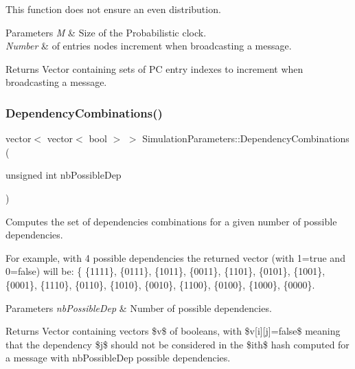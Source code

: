 This function does not ensure an even distribution. 
\begin{DoxyParams}{Parameters}
{\em M} & Size of the Probabilistic clock. \\
\hline
{\em Number} & of entries nodes increment when broadcasting a message. \\
\hline
\end{DoxyParams}
\begin{DoxyReturn}{Returns}
Vector containing sets of PC entry indexes to increment when broadcasting a message. 
\end{DoxyReturn}
\mbox{\label{class_simulation_parameters_a9694dd5f7c2028efe03dc273d8fdcbd7}} 
\subsubsection{\texorpdfstring{Dependency\+Combinations()}{DependencyCombinations()}}
{\footnotesize\ttfamily vector$<$ vector$<$ bool $>$ $>$ Simulation\+Parameters\+::\+Dependency\+Combinations (\begin{DoxyParamCaption}\item[{unsigned int}]{nb\+Possible\+Dep }\end{DoxyParamCaption})\hspace{0.3cm}{\ttfamily [protected]}}



Computes the set of dependencies combinations for a given number of possible dependencies. 

For example, with 4 possible dependencies the returned vector (with 1=true and 0=false) will be\+: \{ \{1111\}, \{0111\}, \{1011\}, \{0011\}, \{1101\}, \{0101\}, \{1001\}, \{0001\}, \{1110\}, \{0110\}, \{1010\}, \{0010\}, \{1100\}, \{0100\}, \{1000\}, \{0000\}. 
\begin{DoxyParams}{Parameters}
{\em nb\+Possible\+Dep} & Number of possible dependencies. \\
\hline
\end{DoxyParams}
\begin{DoxyReturn}{Returns}
Vector containing vectors \$v\$ of booleans, with \$v\mbox{[}i\mbox{]}\mbox{[}j\mbox{]}=false\$ meaning that the dependency \$j\$ should not be considered in the \$ith\$ hash computed for a message with nb\+Possible\+Dep possible dependencies. 
\end{DoxyReturn}
\mbox{\label{class_simulation_parameters_a4e6bb792e1487214e5cf1d64c8841064}} 
